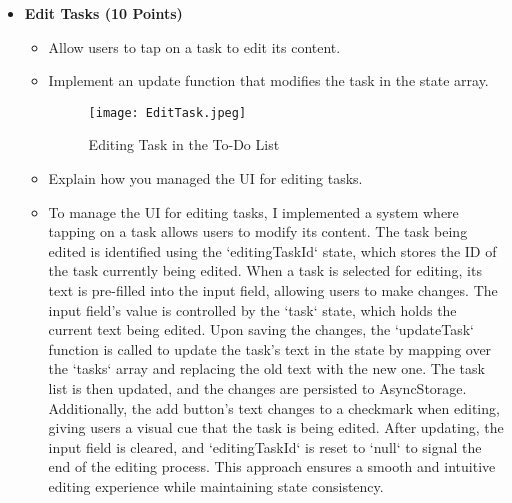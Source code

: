 \documentclass{article}
\begin{document}
\begin{itemize}
    \item \textbf{Edit Tasks (10 Points)}
    \begin{itemize}
        \item Allow users to tap on a task to edit its content.
        \item Implement an update function that modifies the task in the state array.
        \begin{figure}[H]
            \centering
            \texttt{[image: EditTask.jpeg]}
            \caption{Editing Task in the To-Do List}
        \end{figure}

        \item Explain how you managed the UI for editing tasks.
        \item To manage the UI for editing tasks, I implemented a system where tapping on a task allows users to modify its content. The task being edited is identified using the `editingTaskId` state, which stores the ID of the task currently being edited. When a task is selected for editing, its text is pre-filled into the input field, allowing users to make changes. The input field's value is controlled by the `task` state, which holds the current text being edited. Upon saving the changes, the `updateTask` function is called to update the task's text in the state by mapping over the `tasks` array and replacing the old text with the new one. The task list is then updated, and the changes are persisted to AsyncStorage. Additionally, the add button's text changes to a checkmark when editing, giving users a visual cue that the task is being edited. After updating, the input field is cleared, and `editingTaskId` is reset to `null` to signal the end of the editing process. This approach ensures a smooth and intuitive editing experience while maintaining state consistency.
    \end{itemize}
    

\end{itemize}
\end{document}
